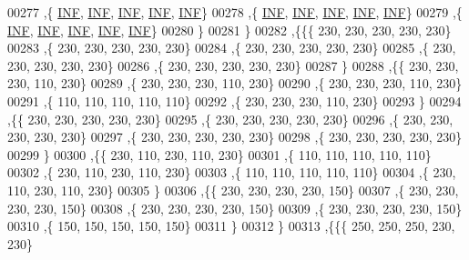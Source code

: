 \begin{DoxyCode}
00277    ,\{   \mbox{\hyperlink{1_88_84__epars_8h_a12c2040f25d8e3a7b9e1c2024c618cb6}{INF}},   \mbox{\hyperlink{1_88_84__epars_8h_a12c2040f25d8e3a7b9e1c2024c618cb6}{INF}},   \mbox{\hyperlink{1_88_84__epars_8h_a12c2040f25d8e3a7b9e1c2024c618cb6}{INF}},   \mbox{\hyperlink{1_88_84__epars_8h_a12c2040f25d8e3a7b9e1c2024c618cb6}{INF}},   \mbox{\hyperlink{1_88_84__epars_8h_a12c2040f25d8e3a7b9e1c2024c618cb6}{INF}}\}
00278    ,\{   \mbox{\hyperlink{1_88_84__epars_8h_a12c2040f25d8e3a7b9e1c2024c618cb6}{INF}},   \mbox{\hyperlink{1_88_84__epars_8h_a12c2040f25d8e3a7b9e1c2024c618cb6}{INF}},   \mbox{\hyperlink{1_88_84__epars_8h_a12c2040f25d8e3a7b9e1c2024c618cb6}{INF}},   \mbox{\hyperlink{1_88_84__epars_8h_a12c2040f25d8e3a7b9e1c2024c618cb6}{INF}},   \mbox{\hyperlink{1_88_84__epars_8h_a12c2040f25d8e3a7b9e1c2024c618cb6}{INF}}\}
00279    ,\{   \mbox{\hyperlink{1_88_84__epars_8h_a12c2040f25d8e3a7b9e1c2024c618cb6}{INF}},   \mbox{\hyperlink{1_88_84__epars_8h_a12c2040f25d8e3a7b9e1c2024c618cb6}{INF}},   \mbox{\hyperlink{1_88_84__epars_8h_a12c2040f25d8e3a7b9e1c2024c618cb6}{INF}},   \mbox{\hyperlink{1_88_84__epars_8h_a12c2040f25d8e3a7b9e1c2024c618cb6}{INF}},   \mbox{\hyperlink{1_88_84__epars_8h_a12c2040f25d8e3a7b9e1c2024c618cb6}{INF}}\}
00280    \}
00281   \}
00282  ,\{\{\{   230,   230,   230,   230,   230\}
00283    ,\{   230,   230,   230,   230,   230\}
00284    ,\{   230,   230,   230,   230,   230\}
00285    ,\{   230,   230,   230,   230,   230\}
00286    ,\{   230,   230,   230,   230,   230\}
00287    \}
00288   ,\{\{   230,   230,   230,   110,   230\}
00289    ,\{   230,   230,   230,   110,   230\}
00290    ,\{   230,   230,   230,   110,   230\}
00291    ,\{   110,   110,   110,   110,   110\}
00292    ,\{   230,   230,   230,   110,   230\}
00293    \}
00294   ,\{\{   230,   230,   230,   230,   230\}
00295    ,\{   230,   230,   230,   230,   230\}
00296    ,\{   230,   230,   230,   230,   230\}
00297    ,\{   230,   230,   230,   230,   230\}
00298    ,\{   230,   230,   230,   230,   230\}
00299    \}
00300   ,\{\{   230,   110,   230,   110,   230\}
00301    ,\{   110,   110,   110,   110,   110\}
00302    ,\{   230,   110,   230,   110,   230\}
00303    ,\{   110,   110,   110,   110,   110\}
00304    ,\{   230,   110,   230,   110,   230\}
00305    \}
00306   ,\{\{   230,   230,   230,   230,   150\}
00307    ,\{   230,   230,   230,   230,   150\}
00308    ,\{   230,   230,   230,   230,   150\}
00309    ,\{   230,   230,   230,   230,   150\}
00310    ,\{   150,   150,   150,   150,   150\}
00311    \}
00312   \}
00313  ,\{\{\{   250,   250,   250,   230,   230\}

\end{DoxyCode}
